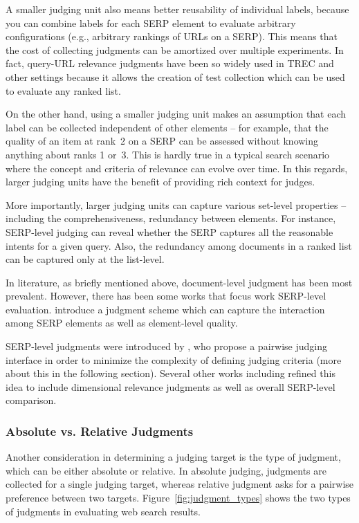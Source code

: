 A smaller judging unit also means better reusability of individual labels, because you can combine labels for each SERP element to evaluate arbitrary configurations (e.g., arbitrary rankings of URLs on a SERP). This means that the cost of collecting judgments can be amortized over multiple experiments. In fact, query-URL relevance judgments have been so widely used in TREC and other settings because it allows the creation of test collection which can be used to evaluate any ranked list.

On the other hand, using a smaller judging unit makes an assumption that each label can be collected independent of other elements -- for example, that the quality of an item at rank~2 on a SERP can be assessed without knowing anything about ranks 1 or~3. This is hardly true in a typical search scenario where the concept and criteria of relevance can evolve over time. In this regards, larger judging units have the benefit of providing rich context for judges. 

More importantly, larger judging units can capture various set-level properties -- including the comprehensiveness, redundancy between elements. For instance, SERP-level judging can reveal whether the SERP captures all the reasonable intents for a given query. Also, the redundancy among documents in a ranked list can be captured only at the list-level. 

In literature, as briefly mentioned above, document-level judgment has been most prevalent. However, there has been some works that focus work SERP-level evaluation. \cite{Bailey2010} introduce a judgment scheme which can capture the interaction among SERP elements as well as element-level quality. 

SERP-level judgments were introduced by \cite{Thomas2006}, who propose a pairwise judging interface in order to minimize the complexity of defining judging criteria (more about this in the following section). Several other works including  \cite{Kim:2013} refined this idea to include dimensional relevance judgments as well as overall SERP-level comparison.

\subsubsection{Absolute vs. Relative Judgments}
Another consideration in determining a judging target is the type of judgment, which can be either absolute or relative. In absolute judging, judgments are collected for a single judging target, whereas relative judgment asks for a pairwise preference between two targets. Figure~\ref{fig:judgment_types} shows the two types of judgments in evaluating web search results.

